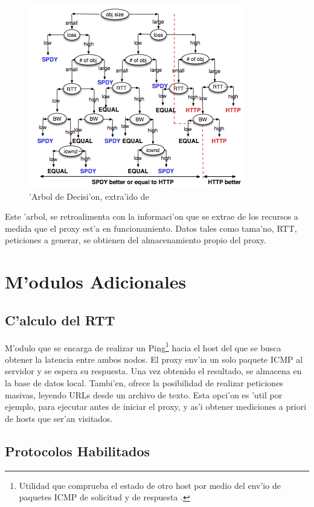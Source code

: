 \begin{figure}[h]
  	\centering
	\includegraphics{img/arbolDecision}
	\caption{\small 'Arbol de Decisi'on, extra'ido de \citep{howSpeedy}}
	\label{arbolDecision}
\end{figure}

Este 'arbol, se retroalimenta con la informaci'on que se extrae de los recursos a medida que el proxy est'a en funcionamiento. Datos tales como tama'no, RTT, peticiones a generar, se obtienen del almacenamiento propio del proxy. 

\vspace{4cm}

\section{M'odulos Adicionales}

\subsection{C'alculo del RTT}
\label{measureRTT}
M'odulo que se encarga de realizar un Ping\footnote{Utilidad que comprueba el estado de otro host por medio del env'io de paquetes ICMP de solicitud y de respuesta \citep{ping}.} hacia el host del que se busca obtener la latencia entre ambos nodos. El proxy env'ia un solo paquete ICMP al servidor y se espera su respuesta. Una vez obtenido el resultado, se almacena en la base de datos local.
Tambi'en, ofrece la posibilidad de realizar peticiones masivas, leyendo URLs desde un archivo de texto. Esta opci'on es 'util por ejemplo, para ejecutar antes de iniciar el proxy, y as'i obtener mediciones a priori de hosts que ser'an visitados.

\subsection{Protocolos Habilitados}

